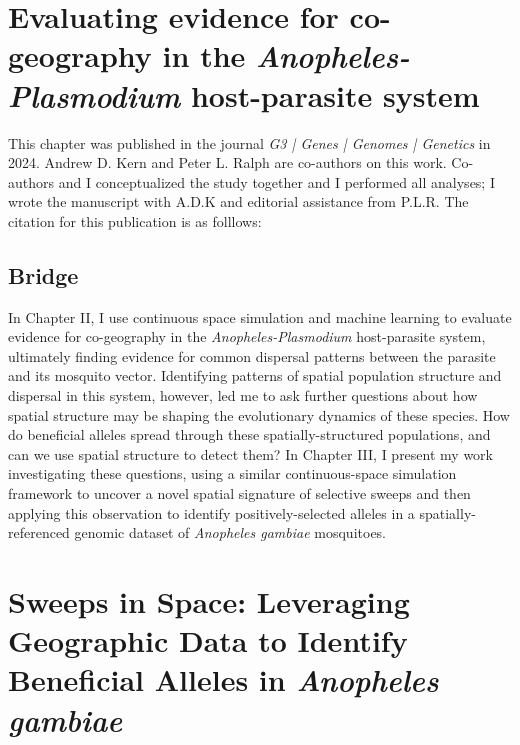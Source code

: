 









\chapter{Evaluating evidence for co-geography in the \textit{Anopheles-Plasmodium} host-parasite system}

\bigskip
This chapter was published in the journal \textit{G3 | Genes | Genomes | Genetics} in 2024.
Andrew D. Kern and Peter L. Ralph are co-authors on this work. 
Co-authors and I conceptualized the study together and I performed all analyses; 
I wrote the manuscript with A.D.K and editorial assistance from P.L.R.
\bigskip
The citation for this publication is as folllows:

\bigskip



\newpage
\section{Bridge}

In Chapter II, I use continuous space simulation and machine learning to evaluate evidence for co-geography in
the \textit{Anopheles-Plasmodium} host-parasite system, ultimately finding evidence for common dispersal patterns between
the parasite and its mosquito vector. 
Identifying patterns of spatial population structure and dispersal in this system, however, led me to ask further 
questions about how spatial structure may be shaping the evolutionary dynamics of these species.
How do beneficial alleles spread through these spatially-structured populations, and can we use spatial structure to detect them?
In Chapter III, I present my work investigating these questions, using a similar continuous-space simulation framework to uncover
a novel spatial signature of selective sweeps and then applying this observation to identify positively-selected alleles 
in a spatially-referenced genomic dataset of \textit{Anopheles gambiae} mosquitoes.


\chapter{Sweeps in Space: Leveraging Geographic Data to Identify Beneficial Alleles in \textit{Anopheles gambiae}}

